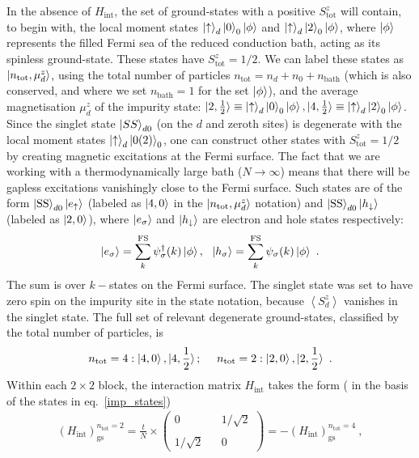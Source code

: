In the absence of \(H_\text{int}\), the set of ground-states with a positive \(S_\text{tot}^z\) will contain, to begin with, the local moment states \(\ket{\uparrow}_d\ket{0}_0\ket{\phi}\) and \(\ket{\uparrow}_d\ket{2}_0\ket{\phi}\), where \(\ket{\phi}\) represents the filled Fermi sea of the reduced conduction bath, acting as its spinless ground-state. These states have \(S_\text{tot}^z = 1/2\). We can label these states as \(\ket{n_\text{tot}, \mu_d^z}\), using the total number of particles \(n_\text{tot} = n_d + n_0 + n_\text{bath}\) (which is also conserved, and where we set \(n_\text{bath} = 1\) for the set \(\ket{\phi}\)), and the average magnetisation \(\mu_d^z\) of the impurity state: \(\ket{2,\frac{1}{2}} \equiv \ket{\uparrow}_d\ket{0}_0\ket{\phi}, \ket{4,\frac{1}{2}} \equiv \ket{\uparrow}_d\ket{2}_0\ket{\phi}\). Since the singlet state \(\ket{SS}_{d0}\) (on the \(d\) and zeroth sites) is degenerate with the local moment states \(\ket{\uparrow}_d\ket{0(2)}_0\), one can construct other states with \(S_\text{tot}^z = 1/2\) by creating magnetic excitations at the Fermi surface. The fact that we are working with a thermodynamically large bath (\(N \to \infty\)) means that there will be gapless excitations vanishingly close to the Fermi surface. Such states are of the form \(\ket{\text{SS}}_{d0}\ket{e_\uparrow}\) (labeled as \(\ket{4,0}\) in the \(\ket{n_\text{tot}, \mu_d^z}\) notation) and \(\ket{\text{SS}}_{d0}\ket{h_\downarrow}\) (labeled as \(\ket{2,0}\)), where \(\ket{e_\sigma}\) and \(\ket{h_\downarrow}\) are electron and hole states respectively:
\begin{eqnarray}
	\ket{e_\sigma} = \sum_k^\text{FS} \psi^\dagger_\sigma(k)\ket{\phi}, ~ ~\ket{h_\sigma} = \sum_k^\text{FS} \psi_\sigma(k)\ket{\phi}~.
\end{eqnarray}
The sum is over \(k-\)states on the Fermi surface. The singlet state was set to have zero spin on the impurity site in the state notation, because \(\left<S_d^z \right>\) vanishes in the singlet state. The full set of relevant degenerate ground-states, classified by the total number of particles, is
\begin{eqnarray}
	n_\text{tot} = 4: \ket{4, 0}, \ket{4, \frac{1}{2}}; ~ ~ ~ ~ n_\text{tot} = 2: \ket{2,0}, \ket{2, \frac{1}{2}}\label{imp_states}~.
\end{eqnarray}
Within each \(2\times 2\) block, the interaction matrix \(H_\text{int}\) takes the form ( in the basis of the states in eq.~\eqref{imp_states})
\begin{eqnarray}
	 \left(H_\text{int}\right)_\text{gs}^{n_\text{tot}=2} = \frac{t}{N} \times \begin{pmatrix}0 && 1/\sqrt 2 \\ \\ 1/\sqrt 2 && 0\end{pmatrix} = -\left(H_\text{int}\right)_\text{gs}^{n_\text{tot}=4}~,
\end{eqnarray}
